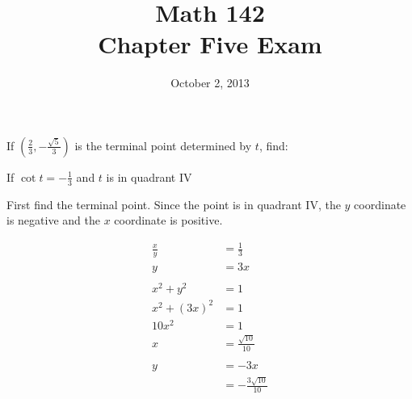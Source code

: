 \documentclass{exam}
\author{}
\date{October 2, 2013}
\title{Math 142 \\ Chapter Five Exam}
\begin{document}
  \maketitle

  \begin{questions}
    
    \question
      If $\left( \frac{2}{3}, - \frac{\sqrt{5}}{3} \right)$ is the terminal point determined by $t$, find:

    \question
      If $\cot t = - \frac{1}{3}$ and $t$ is in quadrant IV

      \begin{solution}
        First find the terminal point.  Since the point is in quadrant IV, the $y$ coordinate is negative and the $x$
        coordinate is positive.

        \begin{align*}
          \frac{x}{y}  & = \frac{1}{3} \\
          y            & = 3x \\
          \\
          x^2 + y^2    & = 1 \\
          x^2 + (3x)^2 & = 1 \\
          10 x^2       & = 1 \\
          x            & = \frac{\sqrt{10}}{10} \\
          \\
          y            & = -3x \\
                       & = -\frac{3 \sqrt{10}}{10}  \\
        \end{align*}


\end{solution}
\end{questions}
\end{document}
